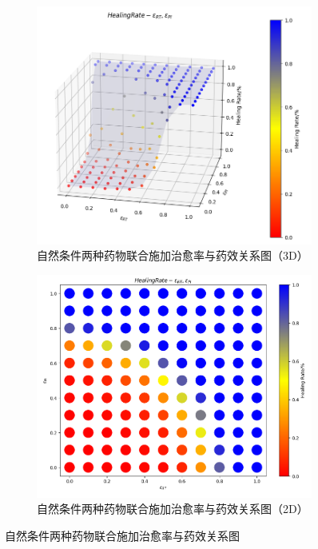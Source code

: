 \documentclass{ctexart}
\begin{document}
\begin{figure}[H]
    \centering
    \begin{subfigure}[b]{0.49\linewidth}
        \includegraphics[width=\linewidth]{7.2.png}
        \caption{自然条件两种药物联合施加治愈率与药效关系图（3D）}
        \label{fig.7.2}
    \end{subfigure}
    \begin{subfigure}[b]{0.49\linewidth}
        \includegraphics[width=\linewidth]{7.3.png}
        \caption{自然条件两种药物联合施加治愈率与药效关系图（2D）}
        \label{fig.7.3}
    \end{subfigure}
    \caption{自然条件两种药物联合施加治愈率与药效关系图}
    \label{fig.7.2-3}
\end{figure}
\end{document}
